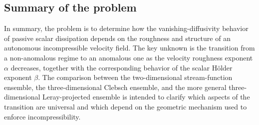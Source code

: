 \subsection{Summary of the problem}

In summary, the problem is to determine how the vanishing-diffusivity behavior of passive scalar dissipation depends on the roughness and structure of an autonomous incompressible velocity field. The key unknown is the transition from a non-anomalous regime to an anomalous one as the velocity roughness exponent $\alpha$ decreases, together with the corresponding behavior of the scalar H\"older exponent $\beta$. The comparison between the two-dimensional stream-function ensemble, the three-dimensional Clebsch ensemble, and the more general three-dimensional Leray-projected ensemble is intended to clarify which aspects of the transition are universal and which depend on the geometric mechanism used to enforce incompressibility.